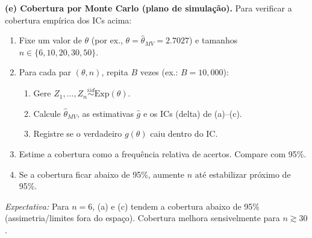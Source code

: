 \bigskip
\textbf{(e) Cobertura por Monte Carlo (plano de simulação).}
Para verificar a cobertura empírica dos ICs acima:
\begin{enumerate}
\item Fixe um valor de $\theta$ (por ex., $\theta=\widehat\theta_{MV}=2.7027$) e tamanhos $n\in\{6,10,20,30,50\}$.
\item Para cada par $(\theta,n)$, repita $B$ vezes (ex.: $B=10{,}000$):
\begin{enumerate}
\item Gere $Z_1,\ldots,Z_n\overset{iid}\sim \mathrm{Exp}(\theta)$.
\item Calcule $\widehat\theta_{MV}$, as estimativas $\widehat g$ e os ICs (delta) de (a)--(c).
\item Registre se o verdadeiro $g(\theta)$ caiu dentro do IC.
\end{enumerate}
\item Estime a cobertura como a frequência relativa de acertos. Compare com 95\%.
\item Se a cobertura ficar abaixo de 95\%, aumente $n$ até estabilizar próximo de 95\%.
\end{enumerate}
\textit{Expectativa:} Para $n=6$, (a) e (c) tendem a cobertura abaixo de 95\% (assimetria/limites fora do espaço).
Cobertura melhora sensivelmente para $n\gtrsim 30$. 
